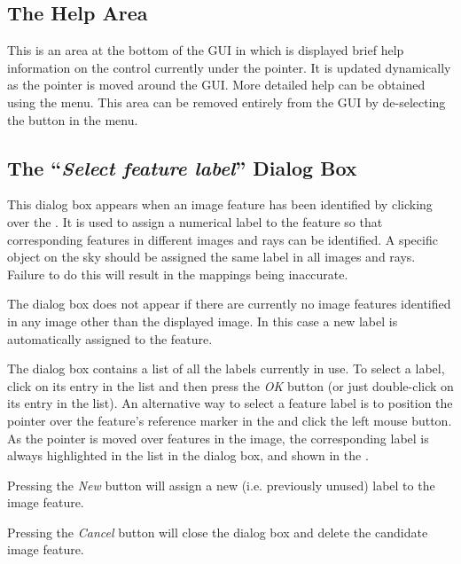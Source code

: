 \subsection {The Help Area}
This is an area at the bottom of the GUI in which is displayed brief help
information on the control currently under the pointer. It is updated
dynamically as the pointer is moved around the GUI. More detailed help
can be obtained using the  menu.
This area can be removed entirely from the GUI by de-selecting the
 button in the
 menu.

\subsection {The ``{\em Select feature label}'' Dialog Box}
This dialog box appears when an image feature has been identified by
clicking over the . It
is used to assign a numerical label to the feature so that corresponding
features in different images and rays can be identified. A specific object
on the sky should be assigned the same label in all images and rays.
Failure to do this will result in the mappings being inaccurate. 

The dialog box does not appear if there are currently no image features
identified in any image other than the displayed image. In this case a
new label is automatically assigned to the feature.

The dialog box contains a list of all the labels currently in use. To
select a label, click on its entry in the list and then press the {\em
OK} button (or just double-click on its entry in the list). An
alternative way to select a feature label is to position the pointer over
the feature's reference marker in the  and click the left mouse button. As the
pointer is moved over features in the image, the corresponding label 
is always highlighted in the list in the dialog box, and shown in the
.

Pressing the {\em New} button will assign a new (i.e. previously unused)
label to the image feature.

Pressing the {\em Cancel} button will close the dialog box and delete the 
candidate image feature.

